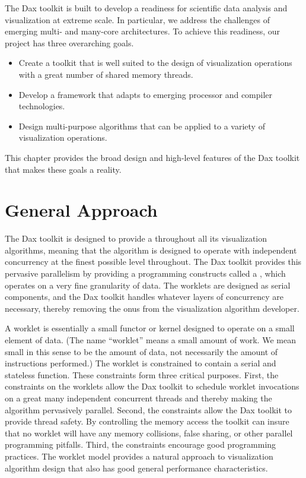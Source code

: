 
The Dax toolkit is built to develop a readiness for scientific data
analysis and visualization at extreme scale. In particular, we address the
challenges of emerging multi- and many-core architectures. To achieve this
readiness, our project has three overarching goals.

\begin{itemize}
\item Create a toolkit that is well suited to the design of visualization
  operations with a great number of shared memory threads.
\item Develop a framework that adapts to emerging processor and compiler
  technologies.
\item Design multi-purpose algorithms that can be applied to a variety of
  visualization operations.
\end{itemize}

This chapter provides the broad design and high-level features of the Dax
toolkit that makes these goals a reality.

\section{General Approach}
\label{sec:GeneralApproach}

The Dax toolkit is designed to provide a 
 throughout all its visualization algorithms,
meaning that the algorithm is designed to operate with independent
concurrency at the finest possible level throughout. The Dax toolkit
provides this pervasive parallelism by providing a programming constructs
called a ,  which operates on a very fine
granularity of data.  The worklets are designed as serial components, and
the Dax toolkit handles whatever layers of concurrency are necessary,
thereby removing the onus from the visualization algorithm developer.

A worklet is essentially a small functor  or kernel
 designed to operate on a small element of data. (The name
``worklet'' means a small amount of work. We mean small in this sense to be
the amount of data, not necessarily the amount of instructions performed.)
The worklet is constrained to contain a serial and stateless
function. These constraints form three critical purposes. First, the
constraints on the worklets allow the Dax toolkit to schedule worklet
invocations on a great many independent concurrent threads and thereby
making the algorithm pervasively parallel. Second, the constraints allow
the Dax toolkit to provide thread safety. By controlling the memory access
the toolkit can insure that no worklet will have any memory collisions,
false sharing, or other parallel programming pitfalls. Third, the
constraints encourage good programming practices. The worklet model
provides a natural approach to visualization algorithm design that also has
good general performance characteristics.

